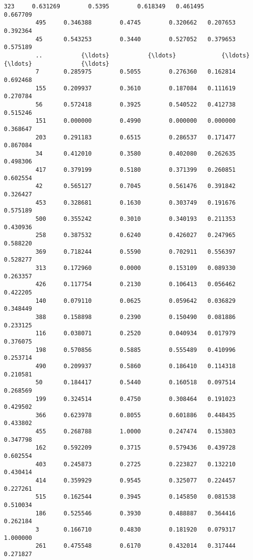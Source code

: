 \documentclass[11pt]{article}
\begin{document}
\begin{Verbatim}[commandchars=\\\{\}]
         323     0.631269        0.5395        0.618349   0.461495         0.667709   
         495     0.346388        0.4745        0.320662   0.207653         0.392364   
         45      0.543253        0.3440        0.527052   0.379653         0.575189   
         ..           {\ldots}           {\ldots}             {\ldots}        {\ldots}              {\ldots}   
         7       0.285975        0.5055        0.276360   0.162814         0.692468   
         155     0.209937        0.3610        0.187084   0.111619         0.270784   
         56      0.572418        0.3925        0.540522   0.412738         0.515246   
         151     0.000000        0.4990        0.000000   0.000000         0.368647   
         203     0.291183        0.6515        0.286537   0.171477         0.867084   
         34      0.412010        0.3580        0.402080   0.262635         0.498306   
         417     0.379199        0.5180        0.371399   0.260851         0.602554   
         42      0.565127        0.7045        0.561476   0.391842         0.326427   
         453     0.328681        0.1630        0.303749   0.191676         0.575189   
         500     0.355242        0.3010        0.340193   0.211353         0.430936   
         258     0.387532        0.6240        0.426027   0.247965         0.588220   
         369     0.718244        0.5590        0.702911   0.556397         0.528277   
         313     0.172960        0.0000        0.153109   0.089330         0.263357   
         426     0.117754        0.2130        0.106413   0.056462         0.422205   
         140     0.079110        0.0625        0.059642   0.036829         0.348449   
         388     0.158898        0.2390        0.150490   0.081886         0.233125   
         116     0.038071        0.2520        0.040934   0.017979         0.376075   
         198     0.570856        0.5885        0.555489   0.410996         0.253714   
         490     0.209937        0.5860        0.186410   0.114318         0.210581   
         50      0.184417        0.5440        0.160518   0.097514         0.268569   
         199     0.324514        0.4750        0.308464   0.191023         0.429502   
         366     0.623978        0.8055        0.601886   0.448435         0.433802   
         455     0.268788        1.0000        0.247474   0.153803         0.347798   
         162     0.592209        0.3715        0.579436   0.439728         0.602554   
         403     0.245873        0.2725        0.223827   0.132210         0.430414   
         414     0.359929        0.9545        0.325077   0.224457         0.227261   
         515     0.162544        0.3945        0.145850   0.081538         0.510034   
         186     0.525546        0.3930        0.488887   0.364416         0.262184   
         3       0.166710        0.4830        0.181920   0.079317         1.000000   
         261     0.475548        0.6170        0.432014   0.317444         0.271827   
         

\end{Verbatim}
\end{document}
